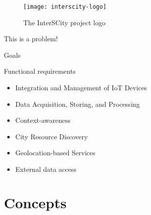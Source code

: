 \documentclass[
  xcolor={hyperref,svgnames,x11names,table},
  hyperref={pdfencoding=unicode,plainpages=false,pdfpagelabels=true,breaklinks=true},
  brazilian,english,12pt,aspectratio=149,
]{beamer}
\begin{document}
\begin{frame}[plain]
  \begin{figure}[H] %
    \texttt{[image: interscity-logo]}
    \caption{The InterSCity project logo}
  \end{figure}
\end{frame}

\begin{frame}[standout]
  This is a problem!
\end{frame}

\begin{frame}{Goals}
  \begin{block}{Functional requirements}
    \begin{itemize}
      \item Integration and Management of \alert{IoT} Devices
      \item Data Acquisition, Storing, and Processing
      \item Context-awareness
      \item City Resource Discovery
      \item Geolocation-based Services
      \item External data access
    \end{itemize}
  \end{block}
\end{frame}

\section{Concepts}
\end{document}
